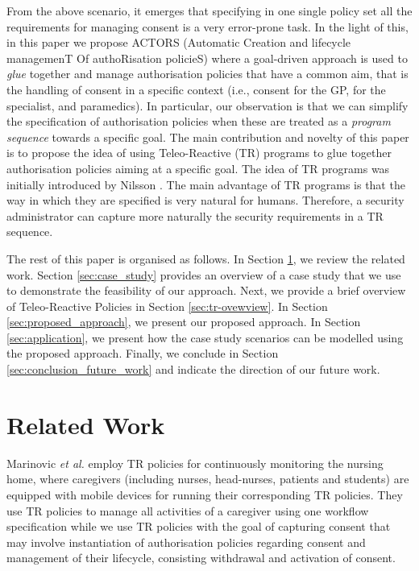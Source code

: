\documentclass[10pt, conference, compsocconf]{IEEEtran}
\begin{document}
From the above scenario, it emerges that specifying in one single policy set all the requirements for managing consent is a very error-prone task. In the light of this, in this paper we propose ACTORS (Automatic Creation and lifecycle managemenT Of authoRisation policieS) where a goal-driven approach is used to \emph{glue} together and manage authorisation policies that have a common aim, that is the handling of consent in a specific context (i.e., consent for the GP, for the specialist, and paramedics). In particular, our observation is that we can simplify the specification of authorisation policies when these are treated as a \emph{program sequence} towards a specific goal. The main contribution and novelty of this paper is to propose the idea of using Teleo-Reactive (TR) programs to glue together authorisation policies aiming at a specific goal. The idea of TR programs was initially introduced by Nilsson \cite{Nilsson1994}. The main advantage of TR programs is that the way in which they are specified is very natural for humans. Therefore, a security administrator can capture more naturally the security requirements in a TR sequence.

The rest of this paper is organised as follows. In Section \ref{sec:related_work}, we review the related work. Section \ref{sec:case_study} provides an overview of a case study that we use to demonstrate the feasibility of our approach. Next, we provide a brief overview of Teleo-Reactive Policies in Section \ref{sec:tr-ovewview}. In Section \ref{sec:proposed_approach}, we present our proposed approach. In Section \ref{sec:application}, we present how the case study scenarios can be modelled using the proposed approach. Finally, we conclude in Section \ref{sec:conclusion_future_work} and indicate the direction of our future work.

\section{Related Work}
\label{sec:related_work}


Marinovic \emph{et al.} \cite{Marinovic2010} employ TR policies for continuously monitoring the nursing home, where caregivers (including nurses, head-nurses, patients and students) are equipped with mobile devices for running their corresponding TR policies. They use TR policies to manage all activities of a caregiver using one workflow specification while we use TR policies with the goal of capturing consent that may involve instantiation of authorisation policies regarding consent and management of their lifecycle, consisting withdrawal and activation of consent.
\end{document}
